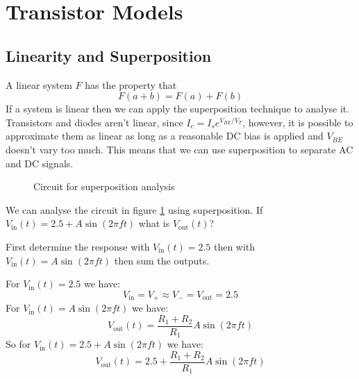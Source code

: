 \documentclass{article}
\begin{document}
    \section{Transistor Models}
    \subsection{Linearity and Superposition}
    A linear system \(F\) has the property that
    \[F(a + b) = F(a) + F(b)\]
    If a system is linear then we can apply the superposition technique to analyse it.
    Transistors and diodes aren't linear, since \(I_c = I_se^{V_{BE}/V_T}\), however, it is possible to approximate them as linear as long as a reasonable DC bias is applied and \(V_{BE}\) doesn't vary too much. 
    This means that we can use superposition to separate AC and DC signals.
    
    \example
    \begin{figure}[ht]
        \centering
        \caption{Circuit for superposition analysis}
        \label{fig:superposition circuit}
    \end{figure}
    
    We can analyse the circuit in figure \ref{fig:superposition circuit} using superposition.
    If \(V_\text{in}(t) = 2.5 + A\sin(2\pi ft)\) what is \(V_\text{out}(t)\)?
    
    First determine the response with \(V_\text{in}(t) = 2.5\) then with \(V_\text{in}(t) = A\sin(2\pi ft)\) then sum the outputs.
    
    For \(V_\text{in}(t) = 2.5\) we have:
    \[V_\text{in} = V_+ \approx V_-=V_\text{out} = 2.5\]
    For \(V_\text{in}(t) = A\sin(2\pi ft)\) we have:
    \[V_\text{out}(t) = \frac{R_1 + R_2}{R_1}A\sin(2\pi ft)\]
    So for \(V_\text{in}(t) = 2.5 + A\sin(2\pi ft)\) we have:
    \[V_\text{out}(t) = 2.5 + \frac{R_1 + R_2}{R_1}A\sin(2\pi ft)\]
    
\end{document}

